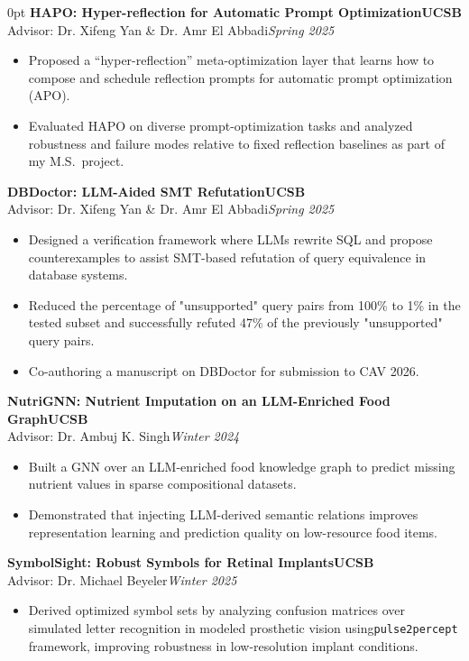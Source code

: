 \documentclass[11pt]{article}
\newlength{\sectionwidth}
\newcommand{\CVSection}[2]{%
  \vspace{1.4em} 
  \noindent
  \makebox[0pt][l]{%
    \parbox[t]{\sectionwidth}{%
      \raggedright\scshape\bfseries\small #1%
    }%
  }%
  \begin{adjustwidth}{\sectionwidth}{0pt}
    #2
  \end{adjustwidth}
}
\newcommand{\CVEntry}[4]{%
  \vspace{0.4em} %
  {\bfseries #1}\hfill {\bfseries #2}\\[0.1em] 
  #3\hfill \textit{#4}
}
\begin{document}
\CVSection{Research\\Experience}{%
\CVEntry
{HAPO: Hyper-reflection for Automatic Prompt Optimization}
    {UCSB}
    {Advisor: Dr. Xifeng Yan \& Dr. Amr El Abbadi}
    {Spring 2025}
  \begin{itemize}
    \item Proposed a ``hyper-reflection'' meta-optimization layer that learns how to compose and schedule reflection prompts for automatic prompt optimization (APO).
    \item Evaluated HAPO on diverse prompt-optimization tasks and analyzed robustness and failure modes relative to fixed reflection baselines as part of my M.S.\ project.
  \end{itemize}
\CVEntry
{DBDoctor: LLM-Aided SMT Refutation}
    {UCSB}
    {Advisor: Dr. Xifeng Yan \& Dr. Amr El Abbadi}
    {Spring 2025}
  \begin{itemize}
    \item Designed a verification framework where LLMs rewrite SQL and propose counterexamples to assist SMT-based refutation of query equivalence in database systems.
    \item Reduced the percentage of "unsupported" query pairs from 100\% to 1\% in the tested subset and successfully refuted 47\% of the previously "unsupported" query pairs.
    \item Co-authoring a manuscript on DBDoctor for submission to CAV 2026.
  \end{itemize}
    \CVEntry
    {NutriGNN: Nutrient Imputation on an LLM-Enriched Food Graph}
    {UCSB}
    {Advisor: Dr. Ambuj K. Singh}
    {Winter 2024}
  \begin{itemize}
    \item Built a GNN over an LLM-enriched food knowledge graph to predict missing nutrient values in sparse compositional datasets.
    \item Demonstrated that injecting LLM-derived semantic relations improves representation learning and prediction quality on low-resource food items.
  \end{itemize}
  \vspace{0.4em}
  \CVEntry
    {SymbolSight: Robust Symbols for Retinal Implants}
    {UCSB}
    {Advisor: Dr. Michael Beyeler}
    {Winter 2025}
  \begin{itemize}
    \item Derived optimized symbol sets by analyzing confusion matrices over simulated letter recognition in modeled prosthetic vision using\texttt{pulse2percept} framework, improving robustness in low-resolution implant conditions.

\end{itemize}}
\end{document}
